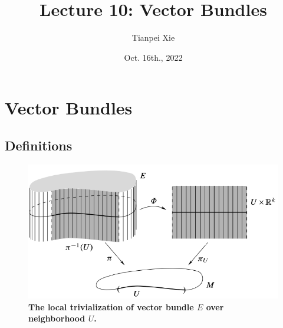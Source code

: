 \documentclass[11pt]{article}
\begin{document}
\title{Lecture 10: Vector Bundles}
\author{ Tianpei Xie}
\date{Oct. 16th., 2022}
\maketitle
\tableofcontents
\newpage
\section{Vector Bundles}
\subsection{Definitions}
\begin{itemize}

\begin{figure}[htb]
\centering
\begin{minipage}{0.5\linewidth}
 \centerline{\includegraphics[scale = 0.45]{local_trivialization.png}}
\end{minipage}
\caption{\scriptsize
\textbf{The local trivialization of vector bundle $E$ over neighborhood $U$. \citep{lee2003introduction} }}
\label{fig: local_trivialization}
\end{figure}




\end{itemize}
\end{document}
